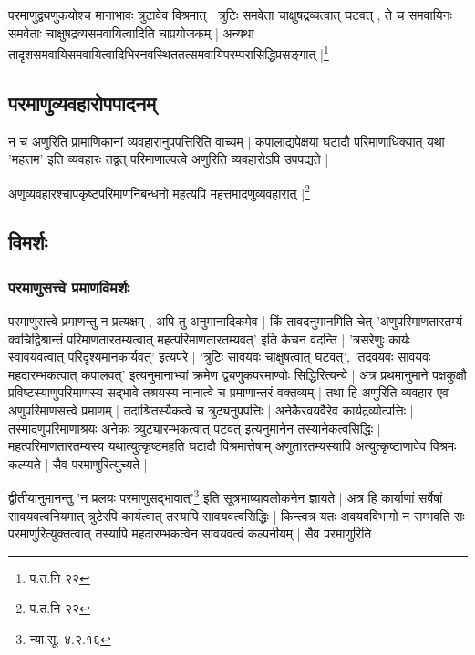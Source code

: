 {\fontsize{11.7}{0}\selectfont\s परमाणुद्व्यणुकयोश्च मानाभावः त्रुटावेव विश्रमात् | त्रुटिः समवेता चाक्षुषद्रव्यत्वात् घटवत् , ते च समवायिनः समवेताः चाक्षुषद्रव्यसमवायित्वादिति चाप्रयोजकम् | अन्यथा तादृशसमवायिसमवायित्वादिभिरनवस्थिततत्समवायिपरम्परासिद्धिप्रसङ्गात् |\footnote{प.त.नि २२}}

\subsection{परमाणुव्यवहारोपपादनम्}

न च अणुरिति प्रामाणिकानां व्यवहारानुपपत्तिरिति वाच्यम् | कपालाद्यपेक्षया घटादौ परिमाणाधिक्यात् यथा 'महत्तम' इति व्यवहारः तद्वत् परिमाणाल्पत्वे अणुरिति व्यवहारोऽपि उपपद्यते |

{\fontsize{11.7}{0}\selectfont\s अणुव्यवहारश्चापकृष्टपरिमाणनिबन्धनो महत्यपि महत्तमादणुव्यवहारात् |\footnote{प.त.नि २२}}


\subsection{विमर्शः}

\subsubsection{परमाणुसत्त्वे प्रमाणविमर्शः}
परमाणुसत्त्वे प्रमाणन्तु न प्रत्यक्षम् , अपि तु अनुमानादिकमेव | किं तावदनुमानमिति चेत् 'अणुपरिमाणतारतम्यं‌ क्वचिद्विश्रान्तं परिमाणतारतम्यत्वात् महत्परिमाणतारतम्यवत्' इति केचन वदन्ति | 'त्रसरेणुः कार्यः स्वावयवत्वात् परिदृश्यमानकार्यवत्' इत्यपरे | 'त्रुटिः सावयवः चाक्षुषत्वात् घटवत्', 'तदवयवः सावयवः महदारम्भकत्वात् कपालवत्' इत्यनुमानाभ्यां क्रमेण द्व्यणुकपरमाण्वोः सिद्धिरित्यन्ये | अत्र प्रथमानुमाने पक्षकुक्षौ प्रविष्टस्याणुपरिमाणस्य सद्भावे तश्रयस्य नानात्वे च प्रमाणान्तरं वक्तव्यम् | तथा हि अणुरिति व्यवहार एव अणुपरिमाणसत्त्वे प्रमाणम् | तदाश्रितस्यैकत्वे च त्रुट्यनुपपत्तिः | अनेकैरवयवैरेव कार्यद्रव्योत्पत्तिः | तस्मादणुपरिमाणाश्रयः अनेकः त्र्युट्यारम्भकत्वात् पटवत् इत्यनुमानेन तस्यानेकत्वसिद्धिः | महत्परिमाणतारतम्यस्य यथात्युत्कृष्टमहति घटादौ विश्रमात्तेषाम् अणुतारतम्यस्यापि अत्युत्कृष्टाणावेव विश्रमः कल्प्यते | सैव परमाणुरित्युच्यते |

द्वीतीयानुमानन्तु 'न प्रलयः परमाणुसद्भावात्'\footnote{न्या.सू. ४.२.१६} इति सूत्रभाष्यावलोकनेन ज्ञायते | अत्र हि कार्याणां सर्वेषां सावयवत्वनियमात् त्रुटेरपि कार्यत्वात् तस्यापि सावयवत्वसिद्धिः | किन्त्वत्र यतः अवयवविभागो न सम्भवति सः परमाणुरित्युक्तत्वात् तस्यापि महदारम्भकत्वेन सावयवत्वं कल्पनीयम् | सैव परमाणुरिति |

